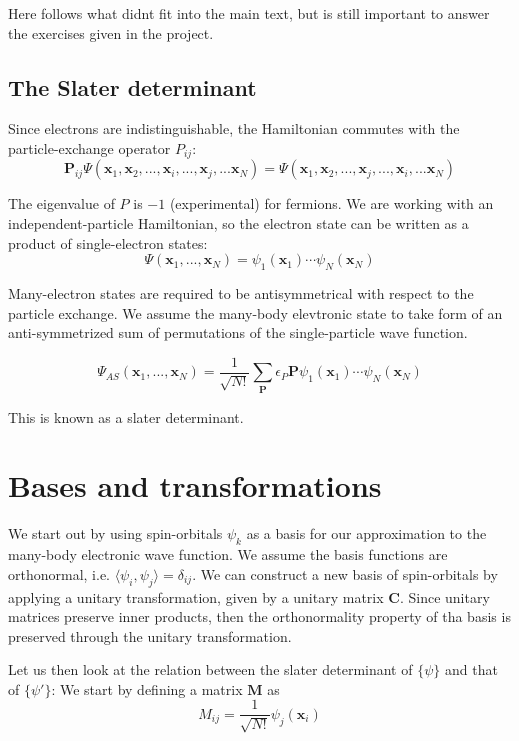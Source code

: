 \documentclass[a4paper,10pt, twocolumn, pre]{revtex4}
\newcommand{\xvec}{\mathbf{x}}
\newcommand{\Pvec}{\mathbf{P}}
\newcommand{\mb}{\mathbf}
\begin{document}
\begin{appendices}
Here follows what didnt fit into the main text, but is still important to answer the exercises given in the project.

\subsection{The Slater determinant}
Since electrons are indistinguishable, the Hamiltonian commutes with the particle-exchange operator $P_{ij}$:
\begin{equation}
	\Pvec_{ij}\Psi(\xvec_1, \xvec_2, ..., \xvec_i, ..., \xvec_j, ... \xvec_N) = \Psi(\xvec_1, \xvec_2, ..., \xvec_j, ..., \xvec_i, ... \xvec_N)
\end{equation}

The eigenvalue of $P$ is $-1$ (experimental) for fermions. We are working with an independent-particle Hamiltonian, so the electron state can be written as a product of single-electron states:
\begin{equation}
	\Psi(\xvec_1, ..., \xvec_N) = \psi_1(\xvec_1)\cdots\psi_N(\xvec_N)
\end{equation}

Many-electron states are required to be antisymmetrical with respect to the particle exchange. We assume the many-body elevtronic state to take form of an anti-symmetrized sum of permutations of the single-particle wave function. 

\begin{equation}
	\Psi_{AS} (\xvec_1, ..., \xvec_N) = \frac{1}{\sqrt{N!}} \sum_\mb{P} \epsilon_P \mb{P} \psi_1(\xvec_1) \cdots \psi_N(\xvec_N)
\end{equation}

This is known as a slater determinant.

\section{Bases and transformations}
We start out by using spin-orbitals $\psi_k$ as a basis for our approximation to the many-body electronic wave function. We assume the basis functions are orthonormal, i.e. $\langle \psi_i, \psi_j \rangle = \delta_{ij}$. We can construct a new basis of spin-orbitals by applying a unitary transformation, given by a unitary matrix $\mb{C}$. Since unitary matrices preserve inner products, then the orthonormality property of tha basis is preserved through the unitary transformation. 


Let us then look at the relation between the slater determinant of $\{ \psi\}$ and that of $\{\psi'\}$:
We start by defining a matrix $\mb{M}$ as
\begin{equation}
	M_{ij} =\frac{1}{\sqrt{N!}} \psi_j(\xvec_i)
\end{equation}


\end{appendices}
\end{document}

